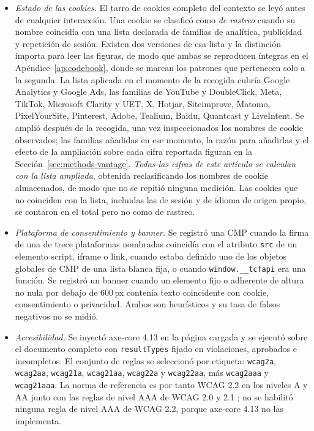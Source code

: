\documentclass[pdflatex,sn-basic,Numbered,iicol]{sn-jnl}
\theoremstyle{thmstyleone}
\theoremstyle{thmstyletwo}
\theoremstyle{thmstylethree}
\begin{document}
\begin{itemize}
	\item \emph{Estado de las cookies.} El tarro de cookies completo del contexto se ley\'o antes de cualquier interacci\'on. Una cookie se clasific\'o como \emph{de rastreo} cuando su nombre coincid\'ia con una lista declarada de familias de anal\'itica, publicidad y repetici\'on de sesi\'on. Existen dos versiones de esa lista y la distinci\'on importa para leer las figuras, de modo que ambas se reproducen \'integras en el Ap\'endice~\ref{ap:codebook}, donde se marcan los patrones que pertenecen solo a la segunda. La lista aplicada en el momento de la recogida cubr\'ia Google Analytics y Google Ads, las familias de YouTube y DoubleClick, Meta, TikTok, Microsoft Clarity y UET, X, Hotjar, Siteimprove, Matomo, PixelYourSite, Pinterest, Adobe, Tealium, Baidu, Quantcast y LiveIntent. Se ampli\'o despu\'es de la recogida, una vez inspeccionados los nombres de cookie observados; las familias a\~nadidas en ese momento, la raz\'on para a\~nadirlas y el efecto de la ampliaci\'on sobre cada cifra reportada figuran en la Secci\'on~\ref{sec:methods-vantage}. \emph{Todas las cifras de este art\'iculo se calculan con la lista ampliada}, obtenida reclasificando los nombres de cookie almacenados, de modo que no se repiti\'o ninguna medici\'on. Las cookies que no coinciden con la lista, incluidas las de sesi\'on y de idioma de origen propio, se contaron en el total pero no como de rastreo.
	\item \emph{Plataforma de consentimiento y banner.} Se registr\'o una CMP cuando la firma de una de trece plataformas nombradas coincid\'ia con el atributo \verb|src| de un elemento script, iframe o link, cuando estaba definido uno de los objetos globales de CMP de una lista blanca fija, o cuando \verb|window.__tcfapi| era una funci\'on. Se registr\'o un banner cuando un elemento fijo o adherente de altura no nula por debajo de 600\,px conten\'ia texto coincidente con cookie, consentimiento o privacidad. Ambos son heur\'isticos y su tasa de falsos negativos no se midi\'o.
	\item \emph{Accesibilidad.} Se inyect\'o axe-core 4.13 \citep{axecore2026} en la p\'agina cargada y se ejecut\'o sobre el documento completo con \verb|resultTypes| fijado en violaciones, aprobados e incompletos. El conjunto de reglas se seleccion\'o por etiqueta: \verb|wcag2a|, \verb|wcag2aa|, \verb|wcag21a|, \verb|wcag21aa|, \verb|wcag22a| y \verb|wcag22aa|, m\'as \verb|wcag2aaa| y \verb|wcag21aaa|. La norma de referencia es por tanto WCAG 2.2 en los niveles A y AA \citep{wcag22} junto con las reglas de nivel AAA de WCAG 2.0 y 2.1 \citep{wcag20,wcag21}; no se habilit\'o ninguna regla de nivel AAA de WCAG 2.2, porque axe-core 4.13 no las implementa.

\end{itemize}
\end{document}
